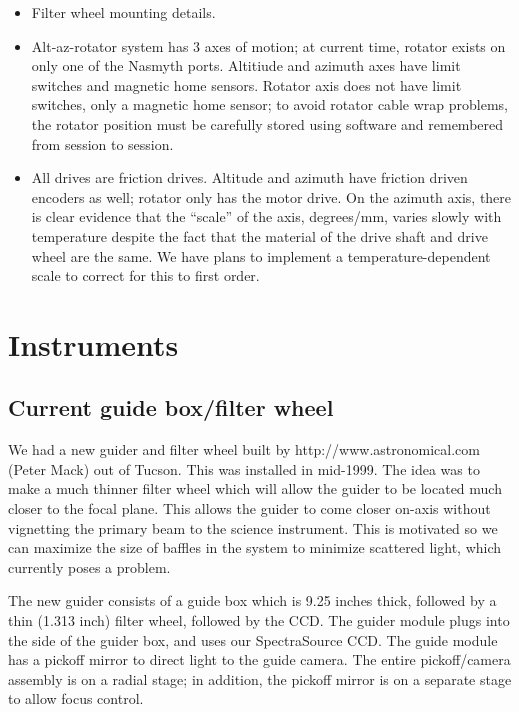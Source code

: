 \documentclass{article}[12pt]
\begin{document}
\begin{itemize}
\item Filter wheel mounting details.

\item Alt-az-rotator system has 3 axes of motion; at current time, rotator
exists on only one of the Nasmyth ports. Altitiude and azimuth axes have
limit switches and magnetic home sensors. Rotator axis does not have
limit switches, only a magnetic home sensor; to avoid rotator cable wrap
problems, the rotator position must be carefully stored using software
and remembered from session to session.

\item All drives are friction drives. Altitude and azimuth have friction
driven encoders as well; rotator only has the motor drive. On the
azimuth axis, there is clear evidence that the ``scale'' of the axis,
degrees/mm, varies slowly with temperature despite the fact that the
material of the drive shaft and drive wheel are the same. We have plans
to implement a temperature-dependent scale to correct for this to
first order.

\end{itemize}

\section{Instruments}

\subsection{Current guide box/filter wheel}

We had a new guider and filter wheel built by
{http://www.astronomical.com} (Peter Mack) out of Tucson. This was installed
in mid-1999.
The idea was to make a much thinner filter
wheel which will allow the guider to be located much closer to the
focal plane. This allows the guider to come closer on-axis without
vignetting the primary beam to the science instrument. This is motivated
so we can maximize the size of baffles in the system to minimize scattered
light, which currently poses a problem. 

The new guider consists of a guide box which is 9.25 inches thick, 
followed by a thin (1.313 inch) filter wheel, followed by the CCD.
The guider module plugs into the side of the guider box, and uses our
SpectraSource CCD. The guide module has a pickoff mirror to direct light
to the guide camera. The entire pickoff/camera assembly is on a radial
stage; in addition, the pickoff mirror is on a separate stage to allow
focus control.
\end{document}
